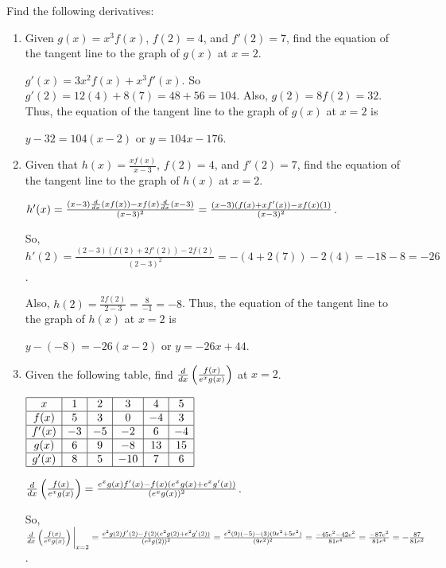 \documentclass[nooutcomes]{ximera}
\begin{document}
\begin{problem}
Find the following derivatives:
	\begin{enumerate}
	
	\item  Given $g(x) = x^3 f(x)$, $f(2) = 4$, and $f'(2) = 7$, find the equation of the tangent line to the graph of $g(x)$ at $x=2$.
		\begin{freeResponse}
		$g'(x) = 3x^2 f(x) + x^3 f'(x)$.  So $g'(2) = 12(4) + 8(7) = 48 + 56 = 104$.  Also, $g(2) = 8f(2) = 32$.  Thus, the equation of the tangent line to the graph of $g(x)$ at $x=2$ is
		
		$y-32 = 104(x-2)$ or $y = 104x - 176$.  
		\end{freeResponse}
		
		
		
	\item  Given that $h(x) = \frac{x f(x)}{x-3}$, $f(2) = 4$, and $f'(2) = 7$, find the equation of the tangent line to the graph of $h(x)$ at $x=2$.  
		\begin{freeResponse}
		$h'(x) = \frac{ (x-3)\frac{d}{dx}(xf(x)) - xf(x)\frac{d}{dx}(x-3)}{(x-3)^2}
		= \frac{(x-3)(f(x) + xf'(x)) - xf(x)(1)}{(x-3)^2}$.
		
		So, $h'(2) = 
		\frac{(2-3)(f(2) + 2f'(2)) - 2f(2)}{(2-3)^2}
		= -(4 + 2(7)) - 2(4)
		= -18 - 8 = -26$.
		
		Also, $h(2) = \frac{2f(2)}{2-3} = \frac{8}{-1} = -8$.  Thus, the equation of the tangent line to the graph of $h(x)$ at $x=2$ is
		
		$y-(-8) = -26(x-2)$ or $y = -26x + 44$.  
		\end{freeResponse}
		
		
		
	\item  Given the following table, find $\frac{d}{dx} \left( \frac{f(x)}{e^x g(x)} \right)$ at $x=2$. 
	
	$\begin{array}{|c|c|c|c|c|c|}
	\hline
	x	&	1	&	2	&	3	&	4	&	5	\\
	\hline
	f(x)	&	5	&	3	&	0	&	-4	&	3	\\
	\hline
	f'(x)	&	-3	&	-5	&	-2	&	6	&	-4	\\
	\hline
	g(x)	&	6	&	9	&	-8	&	13	&	15	\\
	\hline
	g'(x)	&	8	&	5	&	-10	&	7	&	6	\\
	\hline
	\end{array}$
	
	 
		\begin{freeResponse}
		$\frac{d}{dx} \left( \frac{f(x)}{e^x g(x)} \right)
		= \frac{e^x g(x) f'(x) - f(x)(e^x g(x) + e^x g'(x))}{(e^x g(x))^2}$.
		
		So, $\frac{d}{dx}\left(\frac{f(x)}{e^x g(x)}\right) \bigg|_{x=2}
		= \frac{e^2 g(2) f'(2) - f(2)(e^2 g(2) + e^2 g'(2))}{(e^2 g(2))^2}
		= \frac{e^2 (9)(-5) - (3)(9e^2 + 5e^2)}{(9e^2)^2}
		= \frac{-45e^2 -42e^2}{81e^4}
		= \frac{-87e^2}{81e^4}
		= - \frac{87}{81e^2}$.
		\end{freeResponse}
		
		
		
	\end{enumerate}
		
\end{problem}
\end{document}
